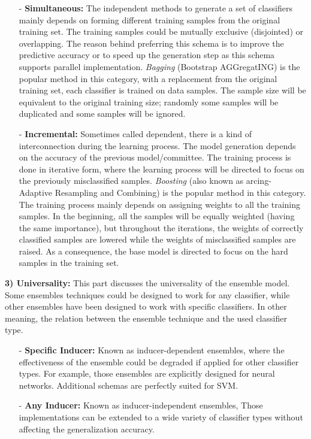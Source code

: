 \begin{itemize}
    \item[-]\textbf{Simultaneous:} The independent methods to generate a set of classifiers mainly depends on forming different training samples from the original training set. The training samples could be mutually exclusive (disjointed) or overlapping. The reason behind preferring this schema is to improve the predictive accuracy or to speed up the generation step as this schema supports parallel implementation. \textit{Bagging} (Bootstrap AGGregatING) \cite{breiman1996} is the popular method in this category, with a replacement from the original training set, each classifier is trained on data samples. The sample size will be equivalent to the original training size; randomly some samples will be duplicated and some samples will be ignored.  
     \item[-]\textbf{Incremental:} Sometimes called dependent, there is a kind of interconnection during the learning process. The model generation depends on the accuracy of the previous model/committee. The training process is done in iterative form, where the learning process will be directed to focus on the previously misclassified samples. \textit{Boosting} \cite{freund1996} (also known as arcing- Adaptive Resampling and Combining) is the popular method in this category. The training process mainly depends on assigning weights to all the training samples. In the beginning, all the samples will be equally weighted (having the same importance), but throughout the iterations, the weights of correctly classified samples are lowered while the weights of misclassified samples are raised. As a consequence, the base model is directed to focus on the hard samples in the training set.          
\end{itemize}


\textbf{3) Universality:}
This part discusses the universality of the ensemble model. Some ensembles techniques could be designed to work for any classifier, while other ensembles have been designed to work with specific classifiers. In other meaning, the relation between the ensemble technique and the used classifier type. 

\begin{itemize}
    \item[-]\textbf{Specific Inducer:} Known as inducer-dependent ensembles, where the effectiveness of the ensemble could be degraded if applied for other classifier types. For example, \cite{hansen1990,lu1999} those ensembles are explicitly designed for neural networks. Additional schemas \cite{tao2006} are perfectly suited for SVM.
    
     \item[-]\textbf{Any Inducer:} Known as inducer-independent ensembles, Those implementations can be extended to a wide variety of classifier types without affecting the generalization accuracy. 
    
\end{itemize}


